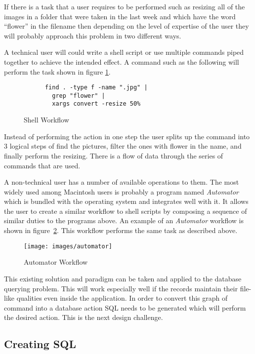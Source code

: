 If there is a task that a user requires to be performed such as resizing all of
the images in a folder that were taken in the last week and which have the word
``flower'' in the filename then depending on the level of expertise of the user
they will probably approach this problem in two different ways.

A technical user will could write a shell script or use multiple commands
piped together to achieve the intended effect. A command such as the following
will perform the task shown in figure \ref{fig:shell}.

\begin{figure}[ht!]
  \centering
	\begin{verbatim}
	  find . -type f -name ".jpg" |
	    grep "flower" |
	    xargs convert -resize 50%
	\end{verbatim}
  \caption{Shell Workflow}
  \label{fig:shell}
\end{figure}

Instead of performing the action in one step the user splits up the command
into 3 logical steps of find the pictures, filter the ones with flower in the
name, and finally perform the resizing. There is a flow of data through the
series of commands that are used.

A non-technical user has a number of available operations to them. The most
widely used among Macintosh users is probably a program named \emph{Automator}
which is bundled with the operating system and integrates well with it. It
allows the user to create a similar workflow to shell scripts by composing
a sequence of similar duties to the programs above. An example of an
\emph{Automator} workflow is shown in figure~\ref{fig:automator}. This workflow
performs the same task as described above.

\begin{figure}[ht!]
  \centering
  \texttt{[image: images/automator]}
  \caption{Automator Workflow}
  \label{fig:automator}
\end{figure}

This existing solution and paradigm can be taken and applied to the database
querying problem. This will work especially well if the records maintain their
file-like qualities even inside the application. In order to convert this graph
of command into a database action \ac{SQL} needs to be generated which will
perform the desired action. This is the next design challenge.

\subsection{Creating SQL}

